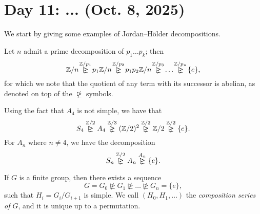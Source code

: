 \section{Day 11: ... (Oct. 8, 2025)}
We start by giving some examples of Jordan--H\"older decompositions.
\begin{example}
    Let $n$ admit a prime decomposition of $p_1 \dots p_k$; then
    \[ \ZZ/n \! \stackrel{\ZZ/p_1}{\nunrhd} \! p_1\ZZ/n \! \stackrel{\ZZ/p_2}{\nunrhd} \! p_1p_2\ZZ/n \! \stackrel{\ZZ/p_3}{\nunrhd} \! \dots \! \stackrel{\ZZ/p_n}{\nunrhd} \! \{e\}, \]
    for which we note that the quotient of any term with its successor is abelian, as denoted on top of the $\nunrhd$ symbols.
\end{example}
\begin{example}
    Using the fact that $A_4$ is not simple, we have that
    \[ S_4 \stackrel{\ZZ/2}{\nunrhd} A_4 \stackrel{\ZZ/3}{\nunrhd} (\ZZ/2)^2 \stackrel{\ZZ/2}{\nunrhd} \ZZ/2 \stackrel{\ZZ/2}{\nunrhd} \{e\}. \]
    For $A_n$ where $n \neq 4$, we have the decomposition
    \[ S_n \stackrel{\ZZ/2}{\nunrhd} A_n \stackrel{A_n}{\nunrhd} \{e\}. \]
\end{example}
\begin{theorem}
    If $G$ is a finite group, then there exists a sequence
    \[ G = G_0 \nunrhd G_1 \nunrhd \dots \nunrhd G_n = \{e\}, \]
    such that $H_i = G_i/G_{i+1}$ is simple. We call $(H_0, H_1, \dots)$ the \textit{composition series of $G$}, and it is unique up to a permutation.
\end{theorem}
